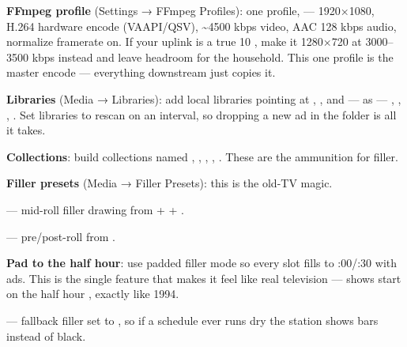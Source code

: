 \documentclass[fontpath=fonts/,logopath=logo/]{riposte-doc}
\begin{document}
\begin{ripnumbers}
\item \textbf{FFmpeg profile} (Settings → FFmpeg Profiles): one profile,  — 1920×1080, H.264 hardware encode (VAAPI/QSV), \textasciitilde{}4500 kbps video, AAC 128 kbps audio, normalize framerate on. If your uplink is a true 10 , make it 1280×720 at 3000–3500 kbps instead and leave headroom for the household. This one profile is the master encode — everything downstream just copies it.
\item \textbf{Libraries} (Media → Libraries): add local libraries pointing at , , and — as  — , , , . Set libraries to rescan on an interval, so dropping a new ad in the folder is all it takes.
\item \textbf{Collections}: build collections named , , , , . These are the ammunition for filler.
\item \textbf{Filler presets} (Media → Filler Presets): this is the old-TV magic.
\begin{ripbullets}
\item {} — mid-roll filler drawing from  +  + .
\item {} — pre/post-roll from .
\item \textbf{Pad to the half hour}: use padded filler mode so every slot fills to :00/:30 with ads. This is the single feature that makes it feel like real television — shows start on the half hour , exactly like 1994.
\item {} — fallback filler set to , so if a schedule ever runs dry the station shows bars instead of black.
\end{ripbullets}


\end{ripnumbers}
\end{document}
